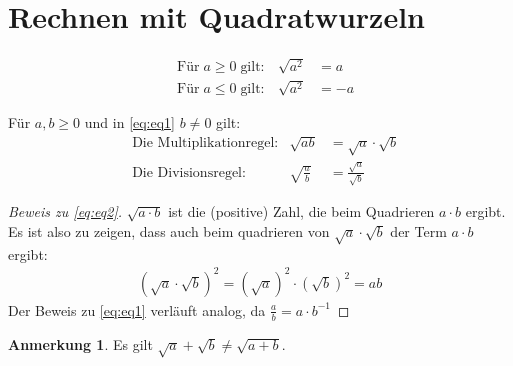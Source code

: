 \documentclass{report}
\newcommand{\x}{\cdot}
\theoremstyle{definition}
\theoremstyle{definition}
\theoremstyle{an}
\newtheorem{anm}{Anmerkung}[section]
\theoremstyle{lem}
\theoremstyle{def}
\theoremstyle{def}
\begin{document}
	\section{Rechnen mit Quadratwurzeln}
	\begin{defi}
		\begin{align}
			&\text{Für}\; a\geq0 \; \text{gilt}:& \sqrt{a^2}&=a \\
			&\text{Für}\; a\leq0 \; \text{gilt}:& \sqrt{a^2}&=-a
		\end{align}%
	\end{defi}
	\begin{defi}
		Für $a,b\geq 0$ und in \eqref{eq:eq1} $b\neq 0$ gilt:
		\begin{align}
			&\text{Die Multiplikationregel}:& \sqrt{ab}&=\sqrt {a} \x \sqrt{b} \label{eq:eq2} \\
			&\text{Die Divisionsregel}:& \sqrt{\frac ab}&=\frac{\sqrt {a}}{\sqrt{b}} \label{eq:eq1}
		\end{align}
	\end{defi} \pagebreak
	\begin{proof}[Beweis zu \eqref{eq:eq2}]
	$\sqrt{a\x b}$ ist die (positive) Zahl, die beim Quadrieren $a\x b$ ergibt. Es ist also zu zeigen, dass auch beim quadrieren von $\sqrt a \x \sqrt b$ der Term $a\x b$ ergibt:
	\begin{align}
		\left(\sqrt{a}\x \sqrt{b}\right)^2= \left(\sqrt a\right)^2 \x \left( \sqrt b \right)^2=ab
	\end{align}
	Der Beweis zu \eqref{eq:eq1} verläuft analog, da $\frac ab =a\x b^{-1}$
	\end{proof}
	\begin{anm}
		Es gilt $\sqrt a +\sqrt b \neq \sqrt{a+b}$.
	\end{anm}
\end{document}
